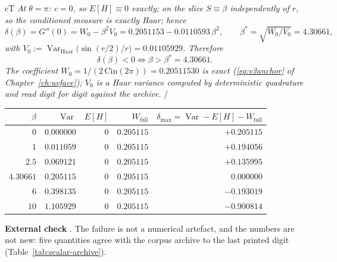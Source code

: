 \begin{claimbox}{cT}
 \emph{At $\theta=\pi$: $c=0$, so $E[H]\equiv0$
exactly; on the slice $S\equiv\beta$ independently of $r$, so the conditioned measure is exactly
Haar; hence}
\begin{equation}
\delta(\beta)=G''(0)=W_0-\beta^2V_0
=0.2051153-0.0110593\,\beta^2,
\qquad
\beta^*=\sqrt{W_0/V_0}=4.30661 ,
\label{eq:scalar-plaq-delta}
\end{equation}
\emph{with $V_0:=\operatorname{Var}_{\mathrm{Haar}}\bigl(\sin(r/2)/r\bigr)=0.01105929$. Therefore}
\begin{equation}
\delta(\beta)<0\iff\beta>\beta^*=4.30661 .
\label{eq:scalar-plaq-zero}
\end{equation}
\emph{The coefficient $W_0=1/(2\,\mathrm{Cin}(2\pi))=0.20511530$ is exact
(\eqref{eq:v3anchor} of Chapter~\ref{ch:uvface}); $V_0$ is a Haar variance computed by
deterministic quadrature and read digit for digit against the archive.}
\LT{}/\LE{}
\end{claimbox}


\footnotesize
\begin{center}
\begin{tabular}{@{}rrrrr@{}}
\toprule
$\beta$ & $\operatorname{Var}$ & $E[H]$ & $W_{\mathrm{full}}$ &
$\delta_{\max}=\operatorname{Var}-E[H]-W_{\mathrm{full}}$\\
\midrule
$0$       & $0.000000$ & $0$ & $0.205115$ & $+0.205115$\\
$1$       & $0.011059$ & $0$ & $0.205115$ & $+0.194056$\\
$2.5$     & $0.069121$ & $0$ & $0.205115$ & $+0.135995$\\
$4.30661$ & $0.205115$ & $0$ & $0.205115$ & $0.000000$\\
$6$       & $0.398135$ & $0$ & $0.205115$ & $-0.193019$\\
$10$      & $1.105929$ & $0$ & $0.205115$ & $-0.900814$\\
\bottomrule
\end{tabular}
\end{center}

\normalsize
\textbf{External check} \LE. The failure is not a numerical artefact, and the numbers are not new:
five quantities agree with the corpus archive to the last printed digit
(Table~\ref{tab:scalar-archive}).

